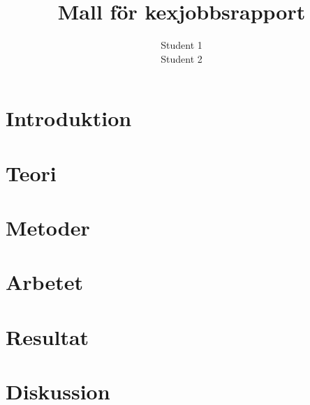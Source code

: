 \documentclass[twoside, openright]{report}
\title{Mall för kexjobbsrapport}
\author{Student 1
\\
Student 2}
\begin{document}
\maketitle
\cleardoublepage
{}
\begin{abstract}

\end{abstract}

\cleardoublepage
{}
\begin{abstract}

\end{abstract}

\newpage
\tableofcontents
\newpage



\newpage
\chapter{Introduktion}\label{chap:intro}


\newpage
\chapter{Teori}\label{chap:teori}


\newpage
\chapter{Metoder}\label{chap:metod}


\newpage
\chapter{Arbetet}\label{chap:arbete}


\newpage
\chapter{Resultat}\label{chap:result}


\newpage
\chapter{Diskussion}\label{chap:diss}
  
\end{document}

